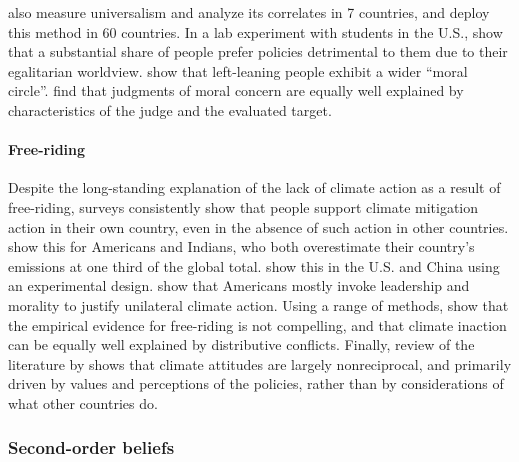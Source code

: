 \citet{enke_moral_2023} also measure universalism and analyze its correlates in 7 countries, and \citet{cappelen_universalism_2022} deploy this method in 60 countries. 
In a lab experiment with students in the U.S., \citet{cherry_accepting_2017} show that a substantial share of people prefer policies detrimental to them due to their egalitarian worldview. \citet{waytz_ideological_2019} show that left-leaning people exhibit a wider ``moral circle''. \citet{jaeger_relative_2023} find that judgments of moral concern are equally well explained by characteristics of the judge and the evaluated target.

\paragraph{Free-riding}

Despite the long-standing explanation of the lack of climate action as a result of free-riding, surveys consistently show that people support climate mitigation action in their own country, even in the absence of such action in other countries. \citet{bernauer_how_2015} show this for Americans and Indians, who both overestimate their country's emissions at one third of the global total. \citet{beiser-mcgrath_commitment_2019} show this in the U.S. and China using an experimental design. \citet{mcevoy_prospects_2016} show that Americans mostly invoke leadership and morality to justify unilateral climate action. Using a range of methods, \citet{aklin_prisoners_2020} show that the empirical evidence for free-riding is not compelling, and that climate inaction can be equally well explained by distributive conflicts. Finally, review of the literature by \citet{mcgrath_how_2017} shows that climate attitudes are largely nonreciprocal, and primarily driven by values and perceptions of the policies, rather than by considerations of what other countries do. %

\subsubsection{Second-order beliefs}\label{subsubsec:literature_beliefs}

